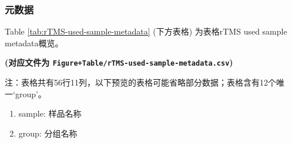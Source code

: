 \documentclass[
]{article}
\providecommand{\tightlist}{%
  \setlength{\itemsep}{0pt}\setlength{\parskip}{0pt}}
\begin{document}
\hypertarget{ux5143ux6570ux636e-2}{%
\subsubsection{元数据}\label{ux5143ux6570ux636e-2}}

Table \ref{tab:rTMS-used-sample-metadata} (下方表格) 为表格rTMS used sample metadata概览。

\textbf{(对应文件为 \texttt{Figure+Table/rTMS-used-sample-metadata.csv})}

\begin{center}\begin{tcolorbox}[colback=gray!10, colframe=gray!50, width=0.9\linewidth, arc=1mm, boxrule=0.5pt]注：表格共有56行11列，以下预览的表格可能省略部分数据；表格含有12个唯一`group'。
\end{tcolorbox}
\end{center}
\begin{center}\begin{tcolorbox}[colback=gray!10, colframe=gray!50, width=0.9\linewidth, arc=1mm, boxrule=0.5pt]\begin{enumerate}\tightlist
\item sample: 样品名称
\item group: 分组名称
\end{enumerate}\end{tcolorbox}
\end{center}
\end{document}
